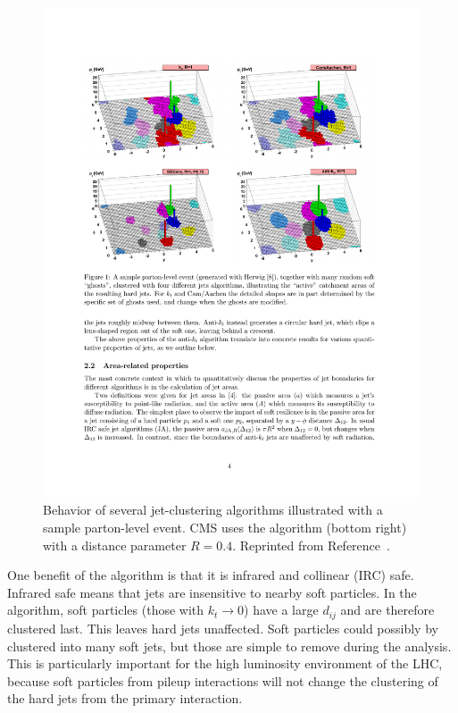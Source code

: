  \begin{figure}[h!]
	\centering
	\includegraphics[width=\linewidth]{Figures/EventReconstruction/jetAlgorithms.pdf}
       \caption{Behavior of several jet-clustering algorithms illustrated with a sample parton-level event. 
       CMS uses the \antikt algorithm (bottom right) with a distance parameter $R = 0.4$.
       Reprinted from Reference~\cite{antikt}.}
       \label{fig:jetAlgorithms}
\end{figure}
 
One benefit of the \antikt algorithm is that it is infrared and collinear (IRC) safe. Infrared safe means that \antikt jets are insensitive to nearby soft particles. In the \antikt algorithm, soft particles (those with $k_t \rightarrow 0$) have a large $d_{ij}$ and are therefore clustered last. This leaves hard jets unaffected. Soft particles could possibly by clustered into many soft jets, but those are simple to remove during the analysis. This is particularly important for the high luminosity environment of the LHC, because soft particles from pileup interactions will not change the clustering of the hard jets from the primary interaction. 

